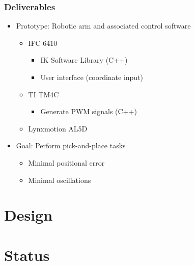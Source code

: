 \documentclass[10pt, compress]{beamer}
\begin{document}
\begin{frame}[fragile]
  \frametitle{Deliverables}
  \begin{itemize}
    \item Prototype: Robotic arm and associated control software
      \begin{itemize}[label=$\circ$]
        \item IFC 6410
          \begin{itemize}[label=$\diamond$]
            \item IK Software Library (C++)
            \item User interface (coordinate input)
          \end{itemize}
        \item TI TM4C
          \begin{itemize}[label=$\circ$]
            \item Generate PWM signals (C++)
          \end{itemize}
        \item Lynxmotion AL5D
      \end{itemize}
    \item Goal: Perform pick-and-place tasks
      \begin{itemize}[label=$\circ$]
        \item Minimal positional error
        \item Minimal oscillations
      \end{itemize}
  \end{itemize}
\end{frame}

\section{Design}

\section{Status}
\end{document}
